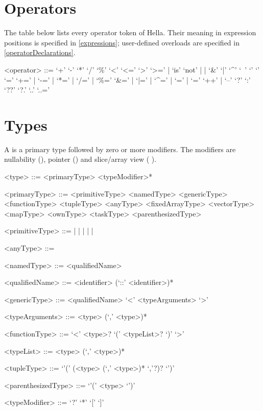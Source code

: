 \documentclass[makeidx]{article}
\begin{document}

\section{Operators}

\LMHash{}%
The table below lists every operator token of Hella.
Their meaning in expression positions is specified in
\ref{expressions}; user-defined overloads are specified in
\ref{operatorDeclarations}.

\begin{grammar}
<operator> ::= `+'
  \alt `-'
  \alt `*'
  \alt `/'
  \alt `\%'
  \alt `<'
  \alt `<='
  \alt `>'
  \alt `>='
  \alt \IS{} | `is' `not'
  \alt \AND{} | \OR{} | \NOT{}
  \alt `\&'
  \alt `|'
  \alt `^'
  \alt `~'
  \alt `\ltlt'
  \alt `\gtgt'
  \alt `='
  \alt `+=' | `-=' | `*=' | `/=' | `\%='
  \alt `\&=' | `|=' | `^=' | `\ltlt=' | `\gtgt='
  \alt `++' | `--'
  \alt `?'
  \alt `:'
  \alt `??'
  \alt `?.'
  \alt `..'
  \alt `..='
\end{grammar}

\section{Types}

\LMHash{}%
A  is a primary type followed by zero or more modifiers.
The modifiers are nullability (), pointer (\code{*})
and slice/array view (\code{[]} ).

\begin{grammar}
<type> ::= <primaryType> <typeModifier>*

<primaryType> ::= <primitiveType>
  \alt <namedType>
  \alt <genericType>
  \alt <functionType>
  \alt <tupleType>
  \alt <anyType>
  \alt <fixedArrayType>
  \alt <vectorType>
  \alt <mapType>
  \alt <ownType>
  \alt <taskType>
  \alt <parenthesizedType>

<primitiveType> ::= \INT{} | \BOOL{} | \FLOAT{} | \DOUBLE{}
  \alt {} | \STRING{} | \VOID{}

<anyType> ::= \ANY{}

<namedType> ::= <qualifiedName>

<qualifiedName> ::= <identifier> (`::' <identifier>)*

<genericType> ::= <qualifiedName> `<' <typeArguments> `>'

<typeArguments> ::= <type> (`,' <type>)*

<functionType> ::= \FUNCTION{} `<' <type>? `(' <typeList>? `)' `>'

<typeList> ::= <type> (`,' <type>)*

<tupleType> ::= `'(' (<type> (`,' <type>)* `,'?)? `')'

<parenthesizedType> ::= `'(' <type> `')'

<typeModifier> ::= `?'
  \alt `*'
  \alt `[' `]'
\end{grammar}
\end{document}
